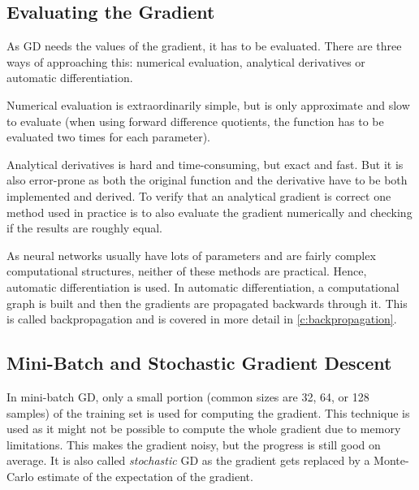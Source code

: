 		\subsection{Evaluating the Gradient}
			As GD needs the values of the gradient, it has to be evaluated. There are three ways of approaching this: numerical evaluation, analytical derivatives or automatic differentiation.

			Numerical evaluation is extraordinarily simple, but is only approximate and slow to evaluate (when using forward difference quotients, the function has to be evaluated two times for each parameter).

			Analytical derivatives is hard and time-consuming, but exact and fast. But it is also error-prone as both the original function and the derivative have to be both implemented and derived. To verify that an analytical gradient is correct one method used in practice is to also evaluate the gradient numerically and checking if the results are roughly equal.

			As neural networks usually have lots of parameters and are fairly complex computational structures, neither of these methods are practical. Hence, automatic differentiation is used. In automatic differentiation, a computational graph is built and then the gradients are propagated backwards through it. This is called backpropagation and is covered in more detail in \autoref{c:backpropagation}.

		\subsection{Mini-Batch and Stochastic Gradient Descent}
			In mini-batch GD, only a small portion (common sizes are \num{32}, \num{64}, or \num{128} samples) of the training set is used for computing the gradient. This technique is used as it might not be possible to compute the whole gradient due to memory limitations. This makes the gradient noisy, but the progress is still good on average. It is also called \emph{stochastic} GD as the gradient gets replaced by a Monte-Carlo estimate of the expectation of the gradient.

